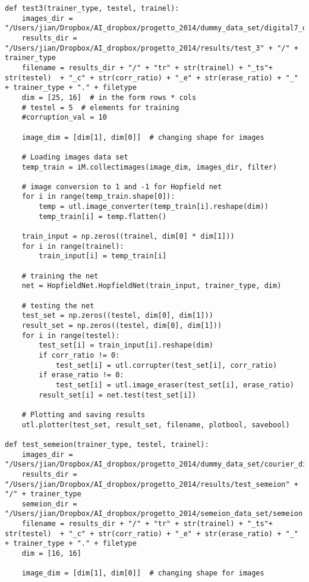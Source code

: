 \documentclass[letterpaper,twocolumn,10pt]{article}
\begin{document}
\begin{lstlisting}
def test3(trainer_type, testel, trainel):
    images_dir = "/Users/jian/Dropbox/AI_dropbox/progetto_2014/dummy_data_set/digital7_digit_data_set/tiff_images_rawcut"
    results_dir = "/Users/jian/Dropbox/AI_dropbox/progetto_2014/results/test_3" + "/" + trainer_type
    filename = results_dir + "/" + "tr" + str(trainel) + "_ts"+ str(testel)  + "_c" + str(corr_ratio) + "_e" + str(erase_ratio) + "_" + trainer_type + "." + filetype
    dim = [25, 16]  # in the form rows * cols
    # testel = 5  # elements for training
    #corruption_val = 10

    image_dim = [dim[1], dim[0]]  # changing shape for images

    # Loading images data set
    temp_train = iM.collectimages(image_dim, images_dir, filter)

    # image conversion to 1 and -1 for Hopfield net
    for i in range(temp_train.shape[0]):
        temp = utl.image_converter(temp_train[i].reshape(dim))
        temp_train[i] = temp.flatten()

    train_input = np.zeros((trainel, dim[0] * dim[1]))
    for i in range(trainel):
        train_input[i] = temp_train[i]

    # training the net
    net = HopfieldNet.HopfieldNet(train_input, trainer_type, dim)

    # testing the net
    test_set = np.zeros((testel, dim[0], dim[1]))
    result_set = np.zeros((testel, dim[0], dim[1]))
    for i in range(testel):
        test_set[i] = train_input[i].reshape(dim)
        if corr_ratio != 0:
            test_set[i] = utl.corrupter(test_set[i], corr_ratio)
        if erase_ratio != 0:
            test_set[i] = utl.image_eraser(test_set[i], erase_ratio)
        result_set[i] = net.test(test_set[i])

    # Plotting and saving results
    utl.plotter(test_set, result_set, filename, plotbool, savebool)

def test_semeion(trainer_type, testel, trainel):
    images_dir = "/Users/jian/Dropbox/AI_dropbox/progetto_2014/dummy_data_set/courier_digits_data_set/tiff_images_swidth"
    results_dir = "/Users/jian/Dropbox/AI_dropbox/progetto_2014/results/test_semeion" + "/" + trainer_type
    semeion_dir = "/Users/jian/Dropbox/AI_dropbox/progetto_2014/semeion_data_set/semeion.data"
    filename = results_dir + "/" + "tr" + str(trainel) + "_ts"+ str(testel)  + "_c" + str(corr_ratio) + "_e" + str(erase_ratio) + "_" + trainer_type + "." + filetype
    dim = [16, 16]

    image_dim = [dim[1], dim[0]]  # changing shape for images


\end{lstlisting}
\end{document}
